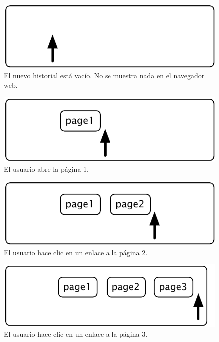 \documentclass[a4paper,10pt,twoside]{book}
\begin{document}
{\begin{figure}[!ht]
\centerline{\includegraphics[scale=0.5]{emptyStef}}
\caption{El nuevo historial est\'a vac\'io. No se muestra nada en el navegador web.}
\vspace{.2in}
\end{figure}

\begin{figure}[!ht]
\centerline{\includegraphics[scale=0.5]{page1Stef}}
\caption{El usuario abre la p\'agina 1.}
\vspace{.2in}
\end{figure}

\begin{figure}[!ht]
\centerline{\includegraphics[scale=0.5]{page2Stef}}
\caption{El usuario hace clic en un enlace a la p\'agina 2.}
\vspace{.2in}
\end{figure}

\begin{figure}[!ht]
\centerline{\includegraphics[scale=0.5]{page3Stef}}
\caption{El usuario hace clic en un enlace a la p\'agina 3.}
\vspace{.2in}
\end{figure}

}
\end{document}
